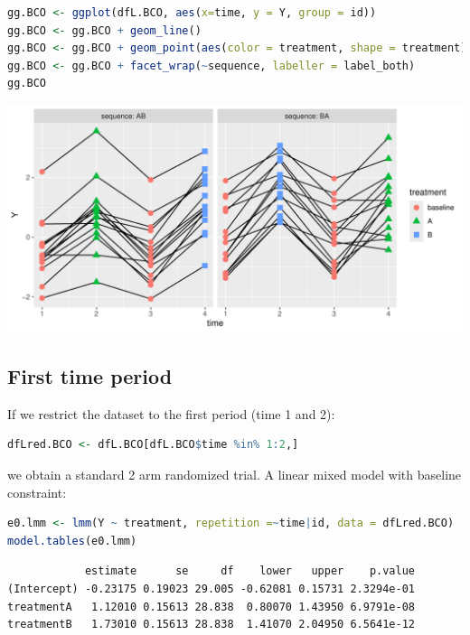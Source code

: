 \documentclass[12pt]{article}
\begin{document}
\begin{lstlisting}[language=r,numbers=none]
gg.BCO <- ggplot(dfL.BCO, aes(x=time, y = Y, group = id))
gg.BCO <- gg.BCO + geom_line()
gg.BCO <- gg.BCO + geom_point(aes(color = treatment, shape = treatment), size = 3)
gg.BCO <- gg.BCO + facet_wrap(~sequence, labeller = label_both)
gg.BCO
\end{lstlisting}

\begin{center}
\includegraphics[trim={0 0 0 0},width=1\textwidth]{./figures/spa-BCO.pdf}
\end{center}
\subsection{First time period}
\label{sec:org69c7936}

If we restrict the dataset to the first period (time 1 and 2):
\begin{lstlisting}[language=r,numbers=none]
dfLred.BCO <- dfL.BCO[dfL.BCO$time %in% 1:2,]
\end{lstlisting}

\noindent we obtain a standard 2 arm randomized trial. A linear mixed
model with baseline constraint:
\begin{lstlisting}[language=r,numbers=none]
e0.lmm <- lmm(Y ~ treatment, repetition =~time|id, data = dfLred.BCO)
model.tables(e0.lmm)
\end{lstlisting}

\label{}
\begin{verbatim}
            estimate      se     df    lower   upper    p.value
(Intercept) -0.23175 0.19023 29.005 -0.62081 0.15731 2.3294e-01
treatmentA   1.12010 0.15613 28.838  0.80070 1.43950 6.9791e-08
treatmentB   1.73010 0.15613 28.838  1.41070 2.04950 6.5641e-12
\end{verbatim}
\end{document}
